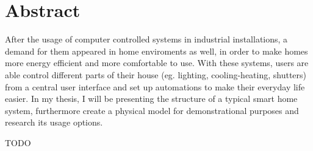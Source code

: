 \vfill
\selectenglish


\chapter*{Abstract}

After the usage of computer controlled systems in industrial installations, a demand for them appeared in home enviroments as well, in order to make homes more energy efficient and more comfortable to use. With these systems, users are able control different parts of their house (eg. lighting, cooling-heating, shutters) from a central user interface and set up automations to make their everyday life easier. In my thesis, I will be presenting the structure of a typical smart home system, furthermore create a physical model for demonstrational purposes and research its usage options.

TODO

\vfill
\selectthesislanguage

\setcounter{romanPage}{\value{page}}
